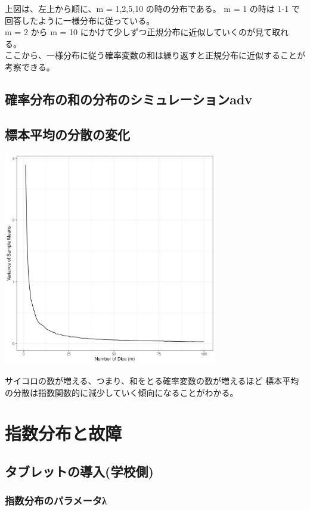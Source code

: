 \documentclass{article}
\begin{document}
上図は、左上から順に、m = 1,2,5,10 の時の分布である。 
m = 1 の時は 1-1 で回答したように一様分布に従っている。\\
m = 2 から m = 10 にかけて少しずつ正規分布に近似していくのが見て取れる。\\
ここから、一様分布に従う確率変数の和は繰り返すと正規分布に近似することが考察できる。

\subsection{確率分布の和の分布のシミュレーションadv}

\subsection{標本平均の分散の変化}
	\begin{center}
		\includegraphics[width=0.7\textwidth]{1-4_plot.png}
	\end{center}

サイコロの数が増える、つまり、和をとる確率変数の数が増えるほど
標本平均の分散は指数関数的に減少していく傾向になることがわかる。

\section{指数分布と故障}
\subsection{タブレットの導入(学校側)}
\subsubsection{指数分布のパラメータλ}
\end{document}
